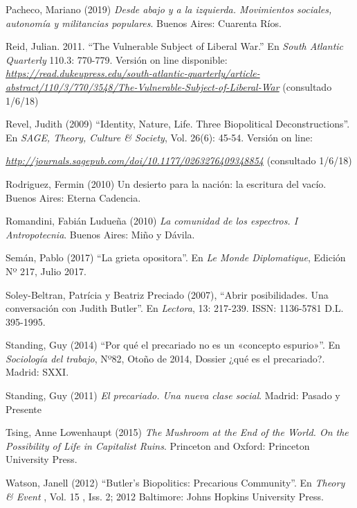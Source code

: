 \documentclass[a4paper,]{scrartcl}
\begin{document}
Pacheco, Mariano (2019) \emph{Desde abajo y a la izquierda. Movimientos
sociales, autonomía y militancias populares}. Buenos Aires: Cuarenta
Ríos.

Reid, Julian. 2011. ``The Vulnerable Subject of Liberal War.'' En
\emph{South Atlantic Quarterly} 110.3: 770-779. Versión on line
disponible:
\href{https://read.dukeupress.edu/south-atlantic-quarterly/article-abstract/110/3/770/3548/The-Vulnerable-Subject-of-Liberal-War}{\emph{https://read.dukeupress.edu/south-atlantic-quarterly/article-abstract/110/3/770/3548/The-Vulnerable-Subject-of-Liberal-War}}
(consultado 1/6/18)

Revel, Judith (2009) ``Identity, Nature, Life. Three Biopolitical
Deconstructions''. En \emph{SAGE, Theory, Culture \& Society}, Vol.
26(6): 45-54. Versión on line:

\href{http://journals.sagepub.com/doi/10.1177/0263276409348854}{\emph{http://journals.sagepub.com/doi/10.1177/0263276409348854}}
(consultado 1/6/18)

Rodriguez, Fermin (2010) Un desierto para la nación: la escritura del
vacío. Buenos Aires: Eterna Cadencia.

Romandini, Fabián Ludueña (2010) \emph{La comunidad de los espectros. I
Antropotecnia}. Buenos Aires: Miño y Dávila.

Semán, Pablo (2017) ``La grieta opositora''. En \emph{Le Monde
Diplomatique}, Edición Nº 217, Julio 2017.

Soley-Beltran, Patrícia y Beatriz Preciado (2007), ``Abrir
posibilidades. Una conversación con Judith Butler''. En \emph{Lectora},
13: 217-239. ISSN: 1136-5781 D.L. 395-1995.

Standing, Guy (2014) ``Por qué el precariado no es un «concepto
espurio»''. En \emph{Sociología del trabajo}, Nº82, Otoño de 2014,
Dossier ¿qué es el precariado?. Madrid: SXXI.

Standing, Guy (2011) \emph{El precariado. Una nueva clase social}.
Madrid: Pasado y Presente

Tsing, Anne Lowenhaupt (2015) \emph{The Mushroom at the End of the
World. On the Possibility of Life in Capitalist Ruins}. Princeton and
Oxford: Princeton University Press.

Watson, Janell (2012) ``Butler's Biopolitics: Precarious Community''. En
\emph{Theory \& Event} , Vol. 15 , Iss. 2; 2012 Baltimore: Johns Hopkins
University Press.
\end{document}
